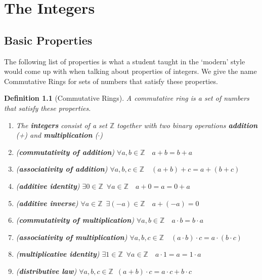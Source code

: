 \documentclass[11pt, oneside]{book}
\theoremstyle{break}
\newtheorem{defn}{Definition}[section]
\newcommand{\bb}[1]{\mathbb{#1}}			%
\begin{document}
\chapter{The Integers}

\section{Basic Properties}

The following list of properties is what a student taught in the `modern' style would come up with when talking about properties of integers. We give the name Commutative Rings for sets of numbers that satisfy these properties.

\begin{defn}[Commutative Rings]\label{defn-commutative-rings}
	A commutative ring is a set of numbers that satisfy these properties.
	\begin{enumerate}
		\item The \textbf{integers} consist of a set $\bb{Z}$ together with two binary operations \textbf{addition} (+) and \textbf{multiplication} ($\cdot$)
		\item (\textbf{commutativity of addition}) $\forall a, b \in \bb{Z} \quad a + b = b + a$
		\item (\textbf{associativity of addition}) $\forall a, b, c \in \bb{Z} \quad (a + b) + c = a + (b + c)$
		\item (\textbf{additive identity}) $\exists 0 \in \bb{Z} \enspace \forall a \in \bb{Z} \quad a + 0 = a = 0 + a$
		\item (\textbf{additive inverse}) $\forall a \in \bb{Z} \enspace \exists (-a) \in \bb{Z} \quad a + (-a) = 0$
		\item (\textbf{commutativity of multiplication}) $\forall a, b \in \bb{Z} \quad a \cdot b = b \cdot a$
		\item (\textbf{associativity of multiplication}) $\forall a, b, c \in \bb{Z} \quad (a \cdot b) \cdot c = a \cdot (b \cdot c)$
		\item (\textbf{multiplicative identity}) $\exists 1 \in \bb{Z} \enspace \forall a \in \bb{Z} \quad a \cdot 1 = a = 1 \cdot a$
		\item (\textbf{distributive law}) $\forall a, b, c \in \bb{Z} \enspace (a + b) \cdot c = a \cdot c + b \cdot c$
	\end{enumerate}
\end{defn}
\end{document}
